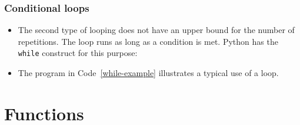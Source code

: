 \documentclass[a4paper]{article}
\begin{document}
\subsubsection{Conditional loops}

\begin{itemize}

\item The second type of looping does not have an upper bound for the number of
repetitions. The loop runs as long as a condition is met. Python has the
\Verb+while+ construct for this purpose:

\item The program in Code~\ref{while-example} illustrates a typical use of a
 loop. 


\end{itemize}

\section{Functions}
\label{sec:functions}
\end{document}
